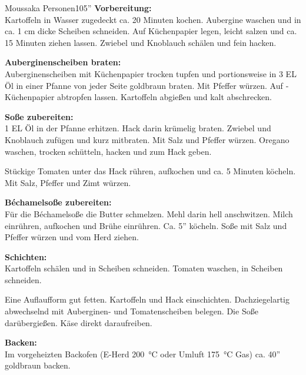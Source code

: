 \begin{MyRecipe}{Moussaka}{ Personen}{105''}
\textbf{Vorbereitung:}\\
Kartoffeln in Wasser zugedeckt ca. 20 Minuten kochen. Aubergine waschen und in ca. 1 cm dicke Scheiben schneiden. Auf ­Küchenpapier legen, leicht salzen und ca. 15 Minuten ziehen lassen. Zwiebel und Knoblauch schälen und fein hacken.\par\bigskip

\textbf{Auberginenscheiben braten:}\\
Auberginenscheiben mit Küchenpapier trocken tupfen und portionsweise in 3 EL Öl in einer Pfanne von jeder Seite goldbraun braten. Mit Pfeffer würzen. Auf ­Küchenpapier abtropfen lassen. Kartoffeln abgießen und kalt abschrecken.\par\bigskip

\textbf{Soße zubereiten:}\\
1 EL Öl in der Pfanne erhitzen. Hack darin krümelig braten. Zwiebel und Knoblauch zufügen und kurz mitbraten. Mit Salz und Pfeffer würzen. Oregano waschen, trocken schütteln, hacken und zum Hack geben. \par
Stückige Tomaten unter das Hack rühren, aufkochen und ca. 5 Minuten köcheln. Mit Salz, Pfeffer und Zimt würzen.\par\bigskip


\textbf{Béchamelsoße zubereiten:}\\
Für die Béchamelsoße die Butter schmelzen. Mehl dar­in hell anschwitzen. Milch einrühren, aufkochen und Brühe einrühren. Ca. 5'' köcheln. Soße mit Salz und Pfeffer würzen und vom Herd ziehen.\par\bigskip


\textbf{Schichten:}\\
Kartoffeln schälen und in Scheiben schneiden. Tomaten waschen, in Scheiben schneiden. \par
Eine Auflaufform gut fetten. Kartoffeln und Hack einschichten. Dachziegelartig abwechselnd mit Auberginen- und Tomatenscheiben belegen. Die Soße darübergießen. Käse direkt daraufreiben. \par\bigskip

\textbf{Backen:}\\
Im vorgeheizten Backofen (E-Herd \SI{200}{\degreeCelsius} oder Umluft \SI{175}{\degreeCelsius} Gas) ca. 40'' goldbraun backen.
		
\end{MyRecipe}
